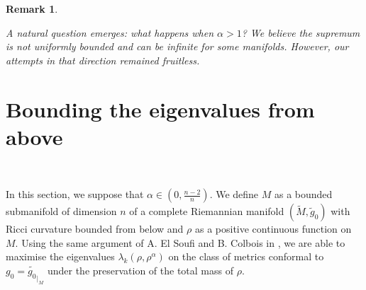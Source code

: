 \documentclass[12pt,reqno]{amsart}		%
\theoremstyle{plain}
\newtheorem{remark}[thm]{Remark}
\theoremstyle{definition}
\theoremstyle{remark}
\numberwithin{equation}{section}
\begin{document}
\begin{remark}\ %

A natural question emerges: what happens when $\alpha > 1$? We believe the supremum
is not uniformly bounded and can be infinite for some manifolds. However, our attempts
in that direction remained fruitless.

\end{remark}



%
%









%
%

















\section{Bounding the eigenvalues from above}\ %

In this section, we suppose that  $\alpha \in \left(0,\frac{n-2}{n}\right)$.
We define $M$ as a bounded submanifold of dimension $n$ of a complete Riemannian manifold $(\tilde{M},\tilde{g}_{0})$ with Ricci curvature bounded from below and $\rho$ as a positive continuous function on $M$. Using the same argument of A. El Soufi and B. Colbois in \cite[Theorem 4.1]{colbois_soufi_2019}, we are able to maximise the eigenvalues $\lambda_k(\rho,\rho^{\alpha})$ on the class of metrics conformal to $g_{0}=\tilde{g_{0}}_{|_{M}}$ under the preservation of the total mass of $\rho$.
\end{document}
